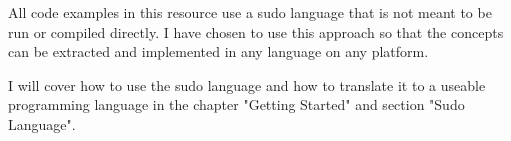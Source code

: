 All code examples in this resource use a sudo language that is not meant to be run or compiled directly.
I have chosen to use this approach so that the concepts can be extracted and implemented in any language
on any platform.
\par

I will cover how to use the sudo language and how to translate it to a useable programming language
in the chapter "Getting Started" and section "Sudo Language".
